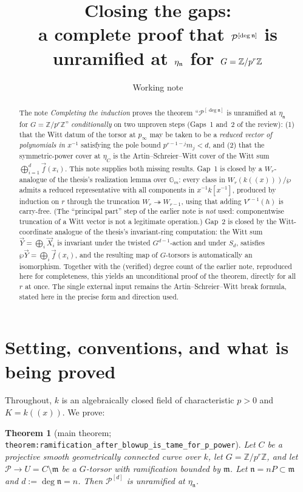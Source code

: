 \documentclass[11pt]{article}
\title{Closing the gaps:\\ a complete proof that $\cP^{[\deg\ndls]}$ is unramified at $\eta_\ndls$ for $G=\Z/p^r\Z$}
\author{Working note}
\date{}
\newcommand{\cP}{\mathcal{P}}
\newcommand{\Z}{\mathbb{Z}}
\newcommand{\bG}{\mathbb{G}}
\newcommand{\mdls}{\mathfrak{m}}
\newcommand{\ndls}{\mathfrak{n}}
\newcommand{\AS}{\wp}
\newcommand{\vf}{\vec f}
\newcommand{\vX}{\vec X}
\newcommand{\vY}{\vec Y}
\theoremstyle{plain}
\newtheorem{theorem}{Theorem}
\theoremstyle{definition}
\begin{document}
\maketitle

\begin{abstract}
The note \emph{Completing the induction} proves the theorem
``$\cP^{[\deg\ndls]}$ is unramified at $\eta_\ndls$ for $G=\Z/p^r\Z$'' \emph{conditionally}
on two unproven steps (Gaps~1 and~2 of the review): (1) that the Witt datum of the torsor
at $p_\infty$ may be taken to be a \emph{reduced vector of polynomials in $x^{-1}$}
satisfying the pole bound $p^{r-1-j}m_j<d$, and (2) that the symmetric-power cover at
$\eta_C$ is the Artin--Schreier--Witt cover of the Witt sum
$\bigoplus_{i=1}^d\vf(x_i)$. This note supplies both missing results.
Gap~1 is closed by a $W_r$-analogue of the thesis's realization lemma over $\bG_m$:
every class in $W_r(k((x)))/\AS$ admits a reduced representative with all components in
$x^{-1}k[x^{-1}]$, produced by induction on $r$ through the truncation
$W_r\twoheadrightarrow W_{r-1}$, using that adding $V^{r-1}(h)$ is carry-free. (The
``principal part'' step of the earlier note is \emph{not} used: componentwise truncation of
a Witt vector is not a legitimate operation.) Gap~2 is closed by the Witt-coordinate
analogue of the thesis's invariant-ring computation: the Witt sum
$\vY=\bigoplus_i\vX_i$ is invariant under the twisted $G^{d-1}$-action and under $S_d$,
satisfies $\AS\vY=\bigoplus_i\vf(x_i)$, and the resulting map of $G$-torsors is
automatically an isomorphism. Together with the (verified) degree count of the earlier
note, reproduced here for completeness, this yields an unconditional proof of the theorem,
directly for all $r$ at once. The single external input remains the
Artin--Schreier--Witt break formula, stated here in the precise form and direction used.
\end{abstract}

\tableofcontents

\section{Setting, conventions, and what is being proved}

Throughout, $k$ is an algebraically closed field of characteristic $p>0$ and
$K=k((x))$. We prove:

\begin{theorem}[{main theorem; \texttt{theorem:ramification\_after\_blowup\_is\_tame\_for\_p\_power}}]\label{thm:main}
Let $C$ be a projective smooth geometrically connected curve over $k$, let
$G=\Z/p^r\Z$, and let $\cP\to U=C\setminus\mdls$ be a $G$-torsor with ramification bounded
by $\mdls$. Let $\ndls=nP\subset\mdls$ and $d:=\deg\ndls=n$. Then $\cP^{[d]}$ is
unramified at $\eta_\ndls$.
\end{theorem}
\end{document}
